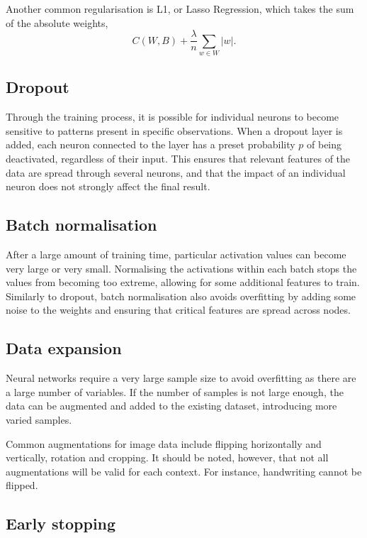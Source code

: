 Another common regularisation is L1, or Lasso Regression, which takes the sum of the absolute weights,
\[
	C(W,B) + \dfrac{\lambda}{n}\sum_{w\in W}|w|.
\]

\subsection*{Dropout}\label{nnet-dropout}

Through the training process, it is possible for individual neurons to become sensitive to patterns present in specific observations. When a dropout layer is added, each neuron connected to the layer has a preset probability $p$ of being deactivated, regardless of their input. This ensures that relevant features of the data are spread through several neurons, and that the impact of an individual neuron does not strongly affect the final result.

\subsection*{Batch normalisation}

After a large amount of training time, particular activation values can become very large or very small. Normalising the activations within each batch stops the values from becoming too extreme, allowing for some additional features to train. Similarly to dropout, batch normalisation also avoids overfitting by adding some noise to the weights and ensuring that critical features are spread across nodes.

\subsection*{Data expansion}

Neural networks require a very large sample size to avoid overfitting as there are a large number of variables. If the number of samples is not large enough, the data can be augmented and added to the existing dataset, introducing more varied samples.

Common augmentations for image data include flipping horizontally and vertically, rotation and cropping. It should be noted, however, that not all augmentations will be valid for each context. For instance, handwriting cannot be flipped. 

\subsection*{Early stopping}\label{nnets-earlystop}

